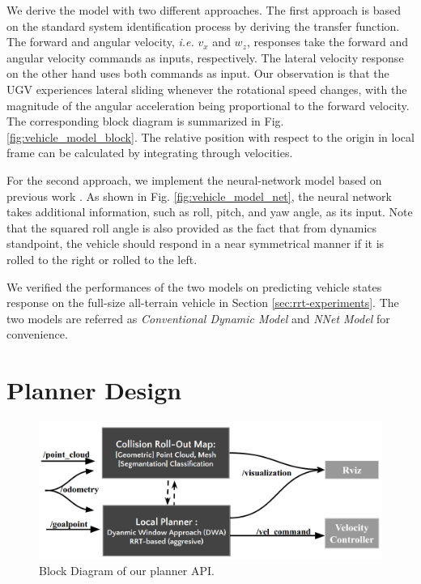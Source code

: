 \documentclass[../thesis.tex]{subfiles}
\begin{document}
We derive the model with two different approaches. The first approach is based on the standard system identification process by deriving the transfer function. The forward and angular velocity, \textit{i.e.} $v_x$ and $w_z$, responses take the forward and angular velocity commands as inputs, respectively. The lateral velocity response on the other hand uses both commands as input. Our observation is that the UGV experiences lateral sliding whenever the rotational speed changes, with the magnitude of the angular acceleration being proportional to the forward velocity. The corresponding block diagram is summarized in Fig. \ref{fig:vehicle_model_block}. The relative position with respect to the origin in local frame can be calculated by integrating through velocities.
 
For the second approach, we implement the neural-network model based on previous work \cite{bode2007learning}. As shown in Fig. \ref{fig:vehicle_model_net}, the neural network takes additional information, such as roll, pitch, and yaw angle, as its input. Note that the squared roll angle is also provided as the fact that from dynamics standpoint, the vehicle should respond in a near symmetrical manner if it is rolled to the right or rolled to the left.
 
We verified the performances of the two models on predicting vehicle states response on the full-size all-terrain vehicle in Section \ref{sec:rrt-experiments}. The two models are referred as \textit{Conventional Dynamic Model} and \textit{NNet Model} for convenience.
 
 
\section{Planner Design} \label{sec:rrt-planner}
 
 
\begin{figure}[t]
    	\begin{center}
    	 \centerline{\includegraphics[width=0.8\columnwidth]{./RRTPlanner/fig/planner_module.png}}
           	\caption{Block Diagram of our planner API.}
           	\label{fig:planner_module}
    	\end{center}
\end{figure}
 
\end{document}
